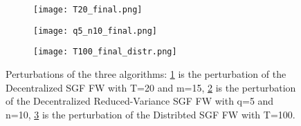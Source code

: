\begin{figure}%
	\centering
	\begin{subfigure}[b]{0.15\textwidth}
		\centering
		\texttt{[image: T20\_final.png]}
		\caption{}
		\label{fig:decentralized_perturbation}
	\end{subfigure}
	\hfill
	\begin{subfigure}[b]{0.15\textwidth}
		\texttt{[image: q5\_n10\_final.png]}
		\caption{}
		\label{fig:variance-reduce_perturbation}
	\end{subfigure}
	\hfill
	\begin{subfigure}[b]{0.15\textwidth}
		\texttt{[image: T100\_final\_distr.png]}
		\caption{}
		\label{fig:distributed_perturbation}
	\end{subfigure}
	\caption{Perturbations of the three algorithms: \ref{fig:decentralized_perturbation} is the perturbation of the Decentralized SGF FW with T=20 and m=15, \ref{fig:variance-reduce_perturbation} is the perturbation of the Decentralized Reduced-Variance SGF FW with q=5 and n=10, \ref{fig:distributed_perturbation} is the perturbation of the Distribted SGF FW with T=100.}
	\label{fig:perturbations}
\end{figure}